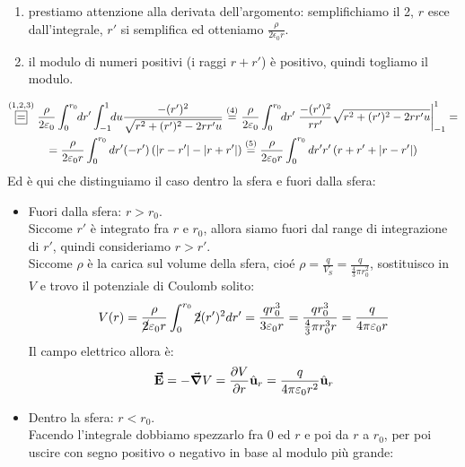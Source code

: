 \begin{examplewt}
\begin{enumerate}
		\item prestiamo attenzione alla derivata dell'argomento: %
		semplifichiamo il 2, $r$ esce dall'integrale, $r'$ si semplifica ed otteniamo $\frac{\rho}{2\epsilon_0 r}$. %
		\item il modulo di numeri positivi (i raggi $r+r'$) è positivo, quindi togliamo il modulo. 
	\end{enumerate}	
	\begin{gather*}
		\stackrel{(1,2,3)}{\squarequal}\frac{\rho}{2\epsilon_0}\int^{r_0}_0 \negthickspace dr'\int^1_{-1}\negthickspace du \frac{-(r')^2}{\sqrt{r^2+(r')^2-2rr'u}} \stackrel{(4)}{=}
		\frac{\rho}{2\epsilon_0}\int^{r_0}_0 \negthickspace dr' \eval{\frac{-(r')^2}{rr'} \sqrt{r^2+(r')^2-2rr'u}}^1_{-1}=\\
		=\frac{\rho}{2\epsilon_0r}\int^{r_0}_0 dr' (-r')\left( \abs{r-r'}-\abs{r+r'} \right)
		\stackrel{(5)}{=}\frac{\rho}{2\epsilon_0r}\int^{r_0}_0 dr' r'\left( r+r' + \abs{r-r'} \right)		
	\end{gather*}
Ed è qui che distinguiamo il caso dentro la sfera e fuori dalla sfera:
	\begin{itemize}
		\item Fuori dalla sfera:  $r>r_0$.\\
		Siccome $r'$ è integrato fra $r$ e $r_0$, allora siamo fuori dal range di integrazione di $r'$, quindi consideriamo $r>r'$.\\
		Siccome $\rho$ è la carica sul volume della sfera, cioé $\rho=\frac{q}{V_S}=\frac{q}{\frac{4}{3} \pi r_0^2}$, sostituisco in $V$ e trovo il potenziale di Coulomb solito:
		\begin{gather*}
			V(r)=\frac{\rho}{\cancel 2\epsilon_0 r}\int^{r_0}_0 \cancel 2 (r')^2 dr'= \frac{q r_0^3}{3\epsilon_0 r}=\frac{qr_0^3}{\frac{4}{3}\pi r_0^3 r}=\frac{q}{4\pi \epsilon_0 r}
		\end{gather*}
		Il campo elettrico allora è:
		\begin{gather*}
			\vba E=-\grad V=\pdv{V}{r}\vbh{u}_r =\frac{q}{4\pi\epsilon_0 r^2}\vbh{u}_r		
		\end{gather*}
		\item Dentro la sfera: $r<r_0$.\\
		Facendo l'integrale dobbiamo spezzarlo fra $0$ ed $r$ e poi da $r$ a $r_0$, per poi uscire con segno positivo o negativo in base al modulo più grande: %

\end{itemize}
\end{examplewt}
